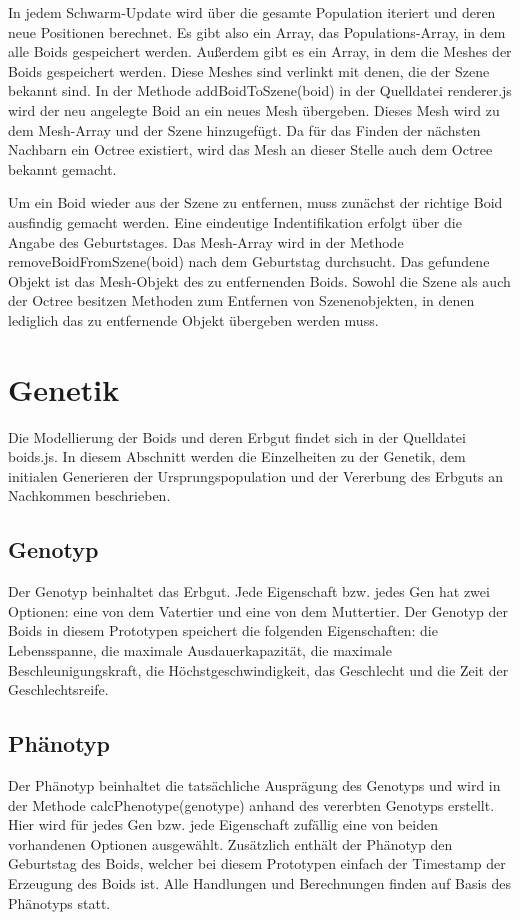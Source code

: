 \documentclass[draft=false
              ,paper=a4
              ,twoside=false
              ,fontsize=11pt
              ,headsepline
              ,BCOR10mm
              ,DIV11
              ,bibtotoc
              ,liststotoc
              ]{scrbook}
\begin{document}
In jedem Schwarm-Update wird über die gesamte Population iteriert und deren neue Positionen berechnet. Es gibt also ein Array, das Populations-Array, in dem alle Boids gespeichert werden. Außerdem gibt es ein Array, in dem die Meshes der Boids gespeichert werden. Diese Meshes sind verlinkt mit denen, die der Szene bekannt sind. In der Methode addBoidToSzene(boid) in der Quelldatei renderer.js wird der neu angelegte Boid an ein neues Mesh übergeben. Dieses Mesh wird zu dem Mesh-Array und der Szene hinzugefügt. Da für das Finden der nächsten Nachbarn ein Octree existiert, wird das Mesh an dieser Stelle auch dem Octree bekannt gemacht.

Um ein Boid wieder aus der Szene zu entfernen, muss zunächst der richtige Boid ausfindig gemacht werden. Eine eindeutige Indentifikation erfolgt über die Angabe des Geburtstages. Das Mesh-Array wird in der Methode removeBoidFromSzene(boid) nach dem Geburtstag durchsucht. Das gefundene Objekt ist das Mesh-Objekt des zu entfernenden Boids. Sowohl die Szene als auch der Octree besitzen Methoden zum Entfernen von Szenenobjekten, in denen lediglich das zu entfernende Objekt übergeben werden muss.

\section{Genetik}
Die Modellierung der Boids und deren Erbgut findet sich in der Quelldatei boids.js. In diesem Abschnitt werden die Einzelheiten zu der Genetik, dem initialen Generieren der Ursprungspopulation und der Vererbung des Erbguts an Nachkommen beschrieben.

\subsection{Genotyp}
Der Genotyp beinhaltet das Erbgut. Jede Eigenschaft bzw. jedes Gen hat zwei Optionen: eine von dem Vatertier und eine von dem Muttertier. Der Genotyp der Boids in diesem Prototypen speichert die folgenden Eigenschaften: die Lebensspanne, die maximale Ausdauerkapazität, die maximale Beschleunigungskraft, die Höchstgeschwindigkeit, das Geschlecht und die Zeit der Geschlechtsreife.

\subsection{Phänotyp}
Der Phänotyp beinhaltet die tatsächliche Ausprägung des Genotyps und wird in der Methode calcPhenotype(genotype) anhand des vererbten Genotyps erstellt. Hier wird für jedes Gen bzw. jede Eigenschaft zufällig eine von beiden vorhandenen Optionen ausgewählt. Zusätzlich enthält der Phänotyp den Geburtstag des Boids, welcher bei diesem Prototypen einfach der Timestamp der Erzeugung des Boids ist. Alle Handlungen und Berechnungen finden auf Basis des Phänotyps statt.
\end{document}
